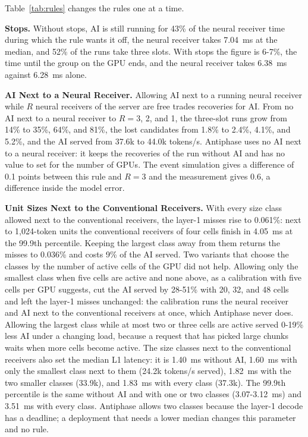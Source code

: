 \documentclass[acmsmall,screen,review,anonymous]{acmart}
\newcommand{\sys}{Antiphase\xspace}
\begin{document}
Table~\ref{tab:rules} changes the rules one at a time.

\noindent\textbf{Stops.} Without stops, AI is still running for 43\% of the neural receiver time during
which the rule wants it off, the neural receiver takes 7.04~ms at the median, and 52\% of the runs take three
slots. With stops the figure is 6-7\%, the time until the group on the GPU ends, and the neural receiver
takes 6.38~ms against 6.28~ms alone.

\noindent\textbf{AI Next to a Neural Receiver.} Allowing AI next to a running neural receiver while $R$
neural receivers of the server are free trades recoveries for AI. From no AI next to a neural receiver to
$R = 3$, 2, and 1, the three-slot runs grow from 14\% to 35\%, 64\%, and 81\%, the lost candidates from 1.8\%
to 2.4\%, 4.1\%, and 5.2\%, and the AI served from 37.6k to 44.0k tokens/s. \sys uses no AI next to a neural
receiver: it keeps the recoveries of the run without AI and has no value to set for the number of GPUs. The
event simulation gives a difference of 0.1 points between this rule and $R = 3$ and the measurement gives
0.6, a difference inside the model error.

\noindent\textbf{Unit Sizes Next to the Conventional Receivers.} With every size class allowed next to the
conventional receivers, the layer-1 misses rise to 0.061\%: next to 1,024-token units the conventional
receivers of four cells finish in 4.05~ms at the 99.9th percentile. Keeping the largest class away from
them returns the misses to 0.036\% and costs 9\% of the AI served. Two variants that choose the classes by
the number of active cells of the GPU did not help. Allowing only the smallest class when five cells are
active and none above, as a calibration with five cells per GPU suggests, cut the AI served by 28-51\% with
20, 32, and 48 cells and left the layer-1 misses unchanged: the calibration runs the neural receiver and AI
next to the conventional receivers at once, which \sys never does. Allowing the largest class while at most
two or three cells are active served 0-19\% less AI under a changing load, because a request that has
picked large chunks waits when more cells become active. The size classes next to the conventional receivers
also set the median L1 latency: it is 1.40~ms without AI, 1.60~ms with only the smallest class next to them
(24.2k tokens/s served), 1.82~ms with the two smaller classes (33.9k), and 1.83~ms with every class (37.3k).
The 99.9th percentile is the same without AI and with one or two classes (3.07-3.12~ms) and 3.51~ms with
every class. \sys allows two classes because the layer-1 decode has a deadline; a deployment that needs a
lower median changes this parameter and no rule.
\end{document}
